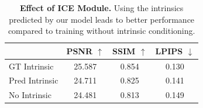 \begin{table}[h!]
\centering
\caption{\textbf{Effect of ICE Module.} Using the intrinsics predicted by our model leads to better performance compared to training without intrinsic conditioning.}
\label{tab:intrinsic_comparison}
\begin{tabular}{l|ccc}
\toprule
 & PSNR $\uparrow$ & SSIM $\uparrow$ & LPIPS $\downarrow$ \\
\midrule
GT Intrinsic & 25.587 & 0.854 & 0.130 \\
Pred Intrinsic & 24.711 & 0.825 & 0.141 \\
No Intrinsic & 24.481 & 0.813 & 0.149 \\
\bottomrule
\end{tabular}
\label{tab:ablation_intrinsic}
\end{table}
